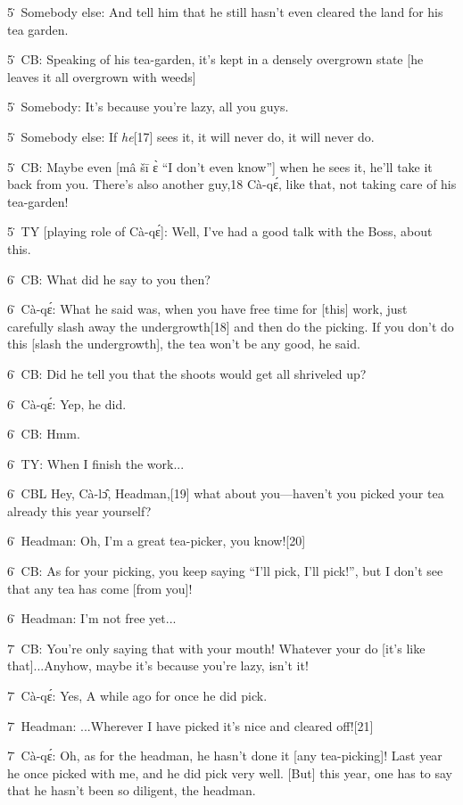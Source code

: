 5\. Somebody else: And tell him that he still hasn't even cleared the land for
his tea garden.

5\. CB: Speaking of his tea-garden, it's kept in a densely overgrown state [he
leaves it all overgrown with weeds]

5\. Somebody: It's because you're lazy, all you guys.

5\. Somebody else: If \textit{he}[17] sees it, it will never do, it will never
do.

5\. CB: Maybe even [mâ šī ɛ̀ ``I don't even know''] when he sees it, he'll
take it back from you.  There's also another guy,18 Cà-qɛ́,\textit{ }like that,
not taking care of his tea-garden!

5\. TY [playing role of Cà-qɛ́]: Well, I've had a good talk with the Boss, about
this.

6\. CB: What did he say to you then?

6\. Cà-qɛ́: What he said was, when you have free time for [this] work, just
carefully slash away the undergrowth[18] and then do the picking.  If you don't
do this [slash the undergrowth], the tea won't be any good, he said.

6\. CB: Did he tell you that the shoots would get all shriveled up?

6\. Cà-qɛ́: Yep, he did.

6\. CB: Hmm.

6\. TY: When I finish the work...

6\. CBL Hey, Cà-lɔ̂, Headman,[19] what about you---haven't you picked your tea
already this year yourself?

6\. Headman: Oh, I'm a great tea-picker, you know![20]

6\. CB: As for your picking, you keep saying ``I'll pick, I'll pick!'', but I don't
see that any tea has come [from you]!

6\. Headman: I'm not free yet...

7\. CB: You're only saying that with your mouth! Whatever your do [it's like that]...Anyhow,
maybe it's because you're lazy, isn't it!

7\. Cà-qɛ́: Yes, A while ago for once he did pick.

7\. Headman: ...Wherever I have picked it's nice and cleared off![21]

7\. Cà-qɛ́: Oh, as for the headman, he hasn't done it [any tea-picking]!  Last
year he once picked with me, and he did pick very well.  [But] this year, one has
to say that he hasn't been so diligent, the headman.

